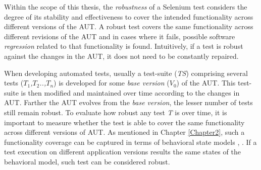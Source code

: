 Within the scope of this thesis, the \textit{robustness} of a Selenium test considers the degree of its stability and effectiveness to cover the intended functionality across different versions of the AUT. A robust test covers the same functionality across different revisions of the AUT and in cases where it fails, possible software \textit{regression} related to that functionality is found. Intuitively, if a test is robust against the changes in the AUT, it does not need to be constantly repaired.



  


When developing automated tests, usually a test-suite (\textit{TS}) comprising several tests (\textit{$T_1$,$T_2$..,$T_n$}) is developed for some \textit{base version} (\textit{$V_{0}$}) of the AUT. This test-suite is then modified and maintained over time according to the changes in AUT. Farther the AUT evolves from the \textit{base version}, the lesser number of tests still remain robust. To evaluate how robust any test \textit{T} is over time, it is important to measure whether the test is able to cover the same functionality across different versions of AUT. As mentioned in Chapter \ref{Chapter2}, such a functionality coverage can be captured in terms of behavioral state models \cite{marchettoStateBased}, \cite{SchurMiningBehavModels}. If a test execution on different application versions results the same states of the behavioral model, such test can be considered robust.

